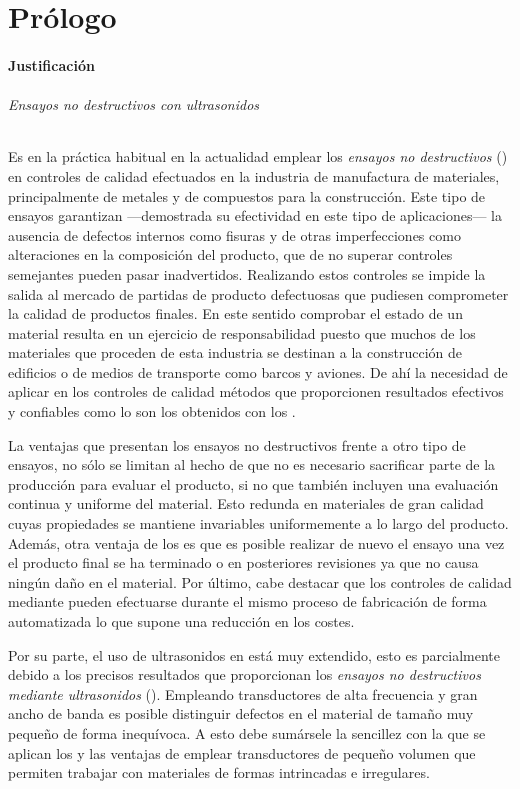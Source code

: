 \chapter{Prólogo}

\subsubsection{Justificación}\vspace*{2.5ex}

\subparagraph{Ensayos no destructivos con ultrasonidos}

Es en la práctica habitual en la actualidad emplear los \emph{ensayos no destructivos} () en controles de calidad efectuados en la industria de manufactura de materiales, principalmente de metales y de compuestos para la construcción. Este tipo de ensayos garantizan ---demostrada su efectividad en este tipo de aplicaciones--- la ausencia de defectos internos como fisuras y de otras imperfecciones como alteraciones en la composición del producto, que de no superar controles semejantes pueden pasar inadvertidos. Realizando estos controles se impide la salida al mercado de partidas de producto defectuosas que pudiesen comprometer la calidad de productos finales. En este sentido comprobar el estado de un material resulta en un ejercicio de responsabilidad puesto que muchos de los materiales que proceden de esta industria se destinan a la construcción de edificios o de medios de transporte como barcos y aviones. De ahí la necesidad de aplicar en los controles de calidad métodos que proporcionen resultados efectivos y confiables como lo son los obtenidos con los .\par
La ventajas que presentan los ensayos no destructivos frente a otro tipo de ensayos, no sólo se limitan al hecho de que no es necesario sacrificar parte de la producción para evaluar el producto, si no que también incluyen una evaluación continua y uniforme del material. Esto redunda en materiales de gran calidad cuyas propiedades se mantiene invariables uniformemente a lo largo del producto. Además, otra ventaja de los  es que es posible realizar de nuevo el ensayo una vez el producto final se ha terminado o en posteriores revisiones ya que no causa ningún daño en el material. Por último, cabe destacar que los controles de calidad mediante  pueden efectuarse durante el mismo proceso de fabricación de forma automatizada lo que supone una reducción en los costes.\par
Por su parte, el uso de ultrasonidos en  está muy extendido, esto es parcialmente debido a los precisos resultados que proporcionan los \emph{ensayos no destructivos mediante ultrasonidos} (). Empleando transductores de alta frecuencia y gran ancho de banda es posible distinguir defectos en el material de tamaño muy pequeño de forma inequívoca. A esto debe sumársele la sencillez con la que se aplican los  y las ventajas de emplear transductores de pequeño volumen que permiten trabajar con materiales de formas intrincadas e irregulares.\par
